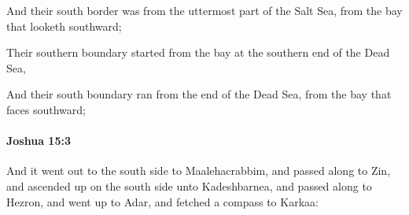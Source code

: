 			\begin{versebox}
					\item[BHS] 
					\item[ASV] And their south border was from the uttermost part of the Salt Sea, from the bay that looketh southward;
					\item[NIV] Their southern boundary started from the bay at the southern end of the Dead Sea,
					\item[NRSV] And their south boundary ran from the end of the Dead Sea, from the bay that faces southward;
			\end{versebox}

		\paragraph{Joshua 15:3} %
			\label{JOSHUA-15-3}

			And it went out to the south side to Maalehacrabbim, and passed along to Zin, and ascended up on the south side unto Kadeshbarnea, and passed along to Hezron, and went up to Adar, and fetched a compass to Karkaa:

